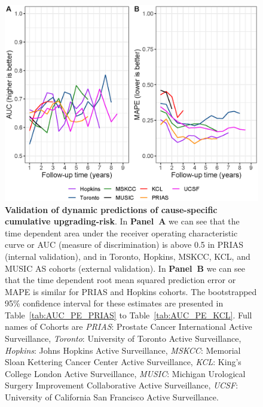 \begin{figure}[!htb]
\centerline{\includegraphics[width=\columnwidth]{images/auc_pe_recalib.eps}}
\caption{\textbf{Validation of dynamic predictions of cause-specific cumulative upgrading-risk}. In \textbf{Panel~A} we can see that the time dependent area under the receiver operating characteristic curve or AUC (measure of discrimination) is above 0.5 in PRIAS (internal validation), and in Toronto, Hopkins, MSKCC, KCL, and MUSIC AS cohorts (external validation). In \textbf{Panel~B} we can see that the time dependent root mean squared prediction error or MAPE is similar for PRIAS and Hopkins cohorts. The bootstrapped 95\% confidence interval for these estimates are presented in Table~\ref{tab:AUC_PE_PRIAS} to Table~\ref{tab:AUC_PE_KCL}. Full names of Cohorts are \textit{PRIAS}: Prostate Cancer International Active Surveillance, \textit{Toronto}: University of Toronto Active Surveillance, \textit{Hopkins}: Johns Hopkins Active Surveillance, \textit{MSKCC}: Memorial Sloan Kettering Cancer Center Active Surveillance, \textit{KCL}: King's College London Active Surveillance, \textit{MUSIC}: Michigan Urological Surgery Improvement Collaborative Active Surveillance, \textit{UCSF}: University of California San Francisco Active Surveillance.}
\label{fig:auc_pe_recalib}
\end{figure}

